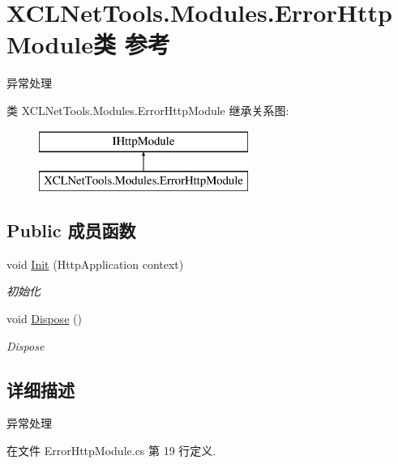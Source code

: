 \hypertarget{class_x_c_l_net_tools_1_1_modules_1_1_error_http_module}{}\section{X\+C\+L\+Net\+Tools.\+Modules.\+Error\+Http\+Module类 参考}
\label{class_x_c_l_net_tools_1_1_modules_1_1_error_http_module}


异常处理  


类 X\+C\+L\+Net\+Tools.\+Modules.\+Error\+Http\+Module 继承关系图\+:\begin{figure}[H]
\begin{center}
\leavevmode
\includegraphics[height=2.000000cm]{class_x_c_l_net_tools_1_1_modules_1_1_error_http_module}
\end{center}
\end{figure}
\subsection*{Public 成员函数}
\begin{DoxyCompactItemize}
\item 
void \hyperlink{class_x_c_l_net_tools_1_1_modules_1_1_error_http_module_a54025f294511e299dd7d5b5c2f33e8ce}{Init} (Http\+Application context)
\begin{DoxyCompactList}\small\item\em 初始化 \end{DoxyCompactList}\item 
void \hyperlink{class_x_c_l_net_tools_1_1_modules_1_1_error_http_module_a86a6bafb14f79ec0551a632f07e90e6d}{Dispose} ()
\begin{DoxyCompactList}\small\item\em Dispose \end{DoxyCompactList}\end{DoxyCompactItemize}


\subsection{详细描述}
异常处理 



在文件 Error\+Http\+Module.\+cs 第 19 行定义.



